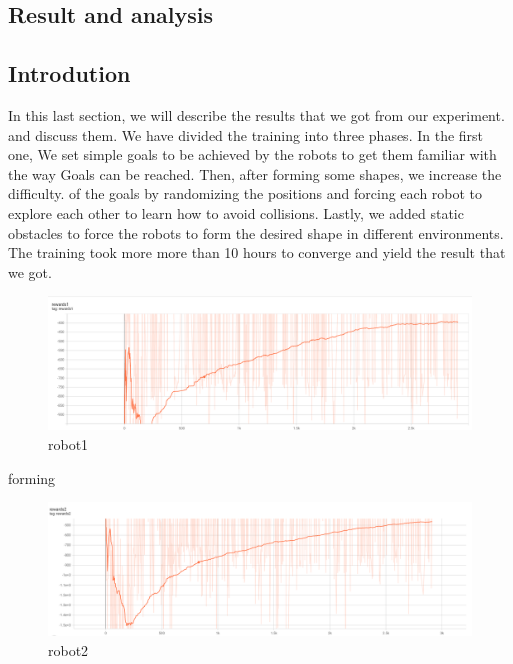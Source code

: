 \documentclass[12pt]{extarticle}
\begin{document}
\afterpage{\clearpage}





\newpage
\pagebreak
\hspace{0pt}
\vfill
\begin{center}
\section{Result and analysis}
\end{center}
\vfill
\hspace{0pt}

\pagebreak

\subsection{Introdution}

In this last section, we will describe the results that we got from our experiment.
and discuss them. We have divided the training into three phases. In the first one,
We set simple goals to be achieved by the robots to get them familiar with the way
Goals can be reached. Then, after forming some shapes, we increase the difficulty.
of the goals by randomizing the positions and forcing each robot to explore each
other to learn how to avoid collisions. Lastly, we added static obstacles to force the
robots to form the desired shape in different environments. The training took more
more than 10 hours to converge and yield the result that we got.









\begin{figure}[h]  

\includegraphics[scale=0.35]{robot1}
\caption[robot1]{robot1}
\end{figure}forming

\begin{figure}[h]  

\includegraphics[scale=0.35]{robot2}
\caption[robot2]{robot2}
\end{figure}
\end{document}

